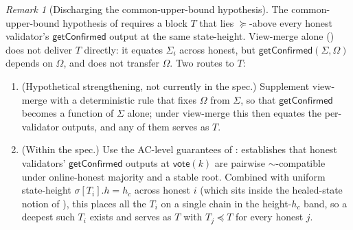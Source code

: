 \documentclass{article}
\newcommand{\vote}{\mathsf{vote}}
\newcommand{\getConfirmed}{\textsf{getConfirmed}\xspace}
\theoremstyle{plain}
\theoremstyle{definition}
\theoremstyle{remark}
\newtheorem{remark}[theorem]{Remark}
\newcommand{\OHM}{online-honest majority\xspace}
\begin{document}
\begin{remark}[Discharging the common-upper-bound hypothesis]\label{rem:freshness-shared-canonical}
The common-upper-bound hypothesis of  requires a block $T$ that lies $\succeq$-above every honest validator's $\getConfirmed$ output at the same state-height.
View-merge alone () does not deliver $T$ directly: it equates $\Sigma_i$ across honest, but $\getConfirmed(\Sigma, \Omega)$ depends on $\Omega$, and  does not transfer $\Omega$.
Two routes to $T$:
\begin{enumerate}
  \item (Hypothetical strengthening, not currently in the spec.) Supplement view-merge with a deterministic rule that fixes $\Omega$ from $\Sigma$, so that $\getConfirmed$ becomes a function of $\Sigma$ alone; under view-merge this then equates the per-validator outputs, and any of them serves as $T$.
  \item (Within the spec.) Use the AC-level guarantees of :  establishes that honest validators' $\getConfirmed$ outputs at $\vote(k)$ are pairwise $\sim$-compatible under \OHM and a stable root.
  Combined with uniform state-height $\sigma[T_i].h = h_c$ across honest $i$ (which sits inside the healed-state notion of ), this places all the $T_i$ on a single chain in the height-$h_c$ band, so a deepest such $T_i$ exists and serves as $T$ with $T_j \preceq T$ for every honest $j$.
\end{enumerate}
\end{remark}
\end{document}
